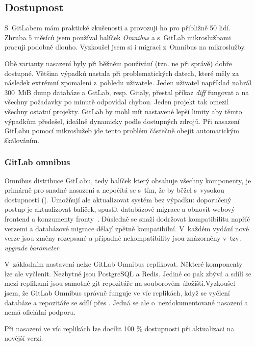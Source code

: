     \subsection{Dostupnost}
        S~GitLabem mám praktické zkušenosti a provozuji ho pro přibližně 50 lidí. Zhruba 5 měsíců jsem používal balíček \textit{Omnibus} a s~GitLab mikroslužbami pracuji podobně dlouho. Vyzkoušel jsem si i migraci z~Omnibus na mikroslužby.

        Obě varianty nasazení byly při běžném používání (tzn. ne při správě) dobře dostupné. Většina výpadků nastala při problematických datech, které měly za následek extrémní zpomalení z~pohledu uživatele. Jeden uživatel například nahrál $300$~MiB dump databáze a GitLab, resp. Gitaly, přestal příkaz \textit{diff} fungovat a na všechny požadavky po minutě odpovídal chybou. Jeden projekt tak omezil všechny ostatní projekty. GitLab by mohl mít nastavené lepší limity aby těmto výpadkům předešel, ideálně dynamicky podle dostupných zdrojů. Při nasazení GitLabu pomocí mikroslužeb jde tento problém částečně obejít automatickým škálováním.

        \subsubsection{GitLab omnibus}
            Omnibus distribuce GitLabu, tedy balíček který obsahuje všechny komponenty, je primárně pro snadné nasazení a nepočítá se s~tím, že by běžel s~vysokou dostupností (\HA). Umožňují ale aktualizovat systém bez výpadku: doporučený postup je aktualizovat balíček, spustit databázové migrace a obnovit webový frontend a konzumenty fronty~\cite{gitlab-omnibus-update}. Důsledně se snaží dodržovat kompatibilitu napříč verzemi a databázové migrace dělají zpětně kompatibilní. V~každém vydání nové verze jsou změny rozepsané a případné nekompatibility jsou znázorněny v~tzv. \textit{upgrade barometer}.

            V~základním nastavení nelze GitLab Omnibus replikovat. Některé komponenty lze ale vyčlenit. Nezbytné jsou PostgreSQL a Redis. Jediné co pak zbývá a sdílí se mezi replikami jsou samotné git repozitáře na souborovém úložišti.\newpage Vyzkoušel jsem, že GitLab Omnibus správně funguje ve víc replikách, když se vyčlení databáze a repozitáře se sdílí přes . Jedná se ale o~nezdokumentované nasazení a nemá oficiální podporu.

            Při nasazení ve víc replikách lze docílit 100 \% dostupnosti při aktualizaci na novější verzi.

